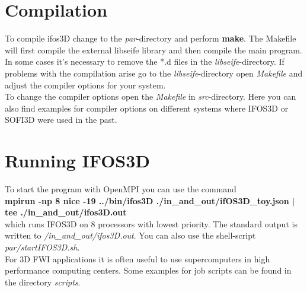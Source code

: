 \section{Compilation}
To compile ifos3D change to the \textit{par}-directory and perform \textbf{make}. The Makefile will first compile the external libseife library and then compile the main program. In some cases it's necessary to  remove the *.d files in the \textit{libseife}-directory. If problems with the compilation arise go to the \textit{libseife}-directory open \textit{Makefile} and adjust the compiler options for your system.\\
To change the compiler options open the \textit{Makefile} in \textit{src}-directory. Here you can also find examples for compiler options on different systems where IFOS3D or SOFI3D were used in the past.
\section{Running IFOS3D}
To start the program with OpenMPI you can use the command\\
\textbf{mpirun -np 8 nice -19 ../bin/ifos3D ./in\_and\_out/ifOS3D\_toy.json $\mid$ tee ./in\_and\_out/ifos3D.out}\\
which runs IFOS3D on 8 processors with lowest priority. The standard output is written to \textit{/in\_and\_out/ifos3D.out}. You can also use the shell-script \textit{par/startIFOS3D.sh}.\\
For 3D FWI applications it is often useful to use supercomputers in high performance computing centers. Some examples for job scripts can be found in the directory \textit{scripts}.
